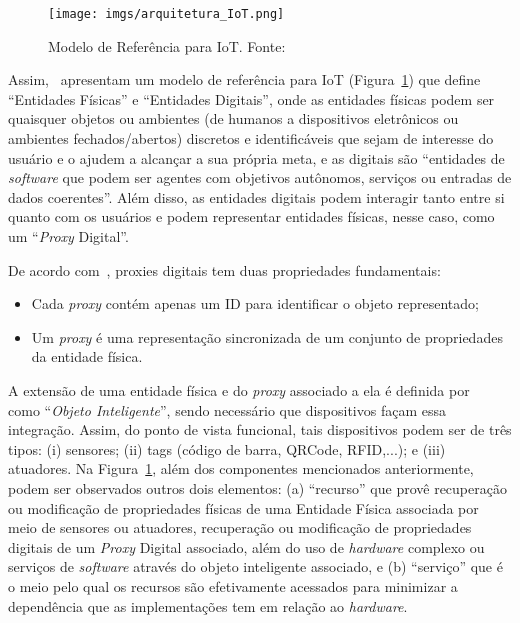 \begin{figure}[htb]
	\centering
	\texttt{[image: imgs/arquitetura\_IoT.png]}
	\caption{Modelo de Referência para IoT. Fonte:~\cite{serbanati:2011}}
	\label{fig:modeloiot}
\end{figure}

Assim,~\cite{serbanati:2011} apresentam um modelo de referência para IoT (Figura~\ref{fig:modeloiot}) que define ``Entidades Físicas'' e ``Entidades Digitais'', onde as entidades físicas podem ser quaisquer objetos ou ambientes (de humanos a dispositivos eletrônicos ou ambientes fechados/abertos) discretos e identificáveis que sejam de interesse do usuário e o ajudem a alcançar a sua própria meta, e as digitais são ``entidades de \textit{software} que podem ser agentes com objetivos autônomos, serviços ou entradas de dados coerentes''. Além disso, as entidades digitais podem interagir tanto entre si quanto com os usuários e podem representar entidades físicas, nesse caso, como um ``\textit{Proxy} Digital''.

De acordo com~\cite{serbanati:2011}, proxies digitais tem duas propriedades fundamentais:
\begin{itemize}
    \item Cada \textit{proxy} contém apenas um ID para identificar o objeto representado;
    \item Um \textit{proxy} é uma representação sincronizada de um conjunto de propriedades da entidade física.
\end{itemize}

A extensão de uma entidade física e do \textit{proxy} associado a ela é definida por~\cite{serbanati:2011} como ``\textit{Objeto Inteligente}'', sendo necessário que dispositivos façam essa integração. Assim, do ponto de vista funcional, tais dispositivos podem ser de três tipos: (i) sensores; (ii) tags (código de barra, QRCode, RFID,...); e (iii) atuadores. Na Figura~\ref{fig:modeloiot}, além dos componentes mencionados anteriormente, podem ser observados outros dois elementos: (a) ``recurso'' que provê recuperação ou modificação de propriedades físicas de uma Entidade Física associada por meio de sensores ou atuadores, recuperação ou modificação de propriedades digitais de um \textit{Proxy} Digital associado, além do uso de \textit{hardware} complexo ou serviços de \textit{software} através do objeto inteligente associado, e (b) ``serviço'' que é o meio pelo qual os recursos são efetivamente acessados para minimizar a dependência que as implementações tem em relação ao  \textit{hardware}.

